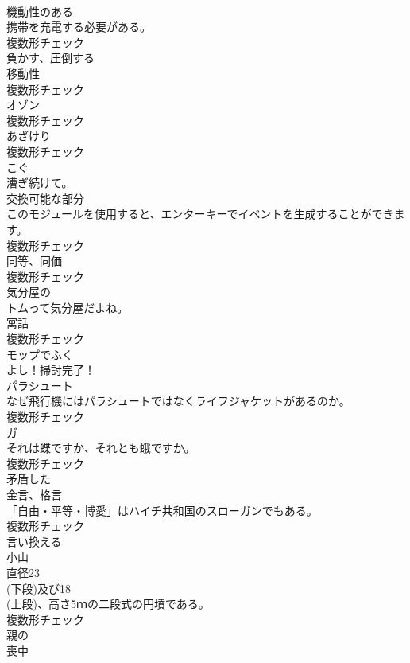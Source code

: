 \documentclass[8pt]{extreport}
\begin{document}
\begin{CJK}{UTF8}{min}
\\	[名詞]	機動性のある	
\\	携帯を充電する必要がある。	
\\	複数形チェック
\\	[動詞]	負かす、圧倒する	
\\	[名詞]	移動性	
\\	複数形チェック
\\	[名詞]	オゾン	
\\	複数形チェック
\\	[名詞]	あざけり	
\\	複数形チェック
\\	[動詞]	こぐ	
\\	漕ぎ続けて。	
\\	[名詞]	交換可能な部分	
\\	このモジュールを使用すると、エンターキーでイベントを生成することができます。	
\\	複数形チェック
\\	[名詞]	同等、同価	
\\	複数形チェック
\\	[形容詞]	気分屋の	
\\	トムって気分屋だよね。	
\\	[名詞]	寓話	
\\	複数形チェック
\\	[動詞]	モップでふく	
\\	よし！掃討完了！	
\\	[名詞]	パラシュート	
\\	なぜ飛行機にはパラシュートではなくライフジャケットがあるのか。	
\\	複数形チェック
\\	[名詞]	ガ	
\\	それは蝶ですか、それとも蛾ですか。	
\\	複数形チェック
\\	[形容詞]	矛盾した	
\\	[名詞]	金言、格言	
\\	「自由・平等・博愛」はハイチ共和国のスローガンでもある。	
\\	複数形チェック
\\	[動詞]	言い換える	
\\	[名詞]	小山	
\\	直径23
\\	(下段)及び18
\\	(上段)、高さ5ｍの二段式の円墳である。	
\\	複数形チェック
\\	[形容詞]	親の	
\\	[名詞]	喪中	

\end{CJK}
\end{document}
